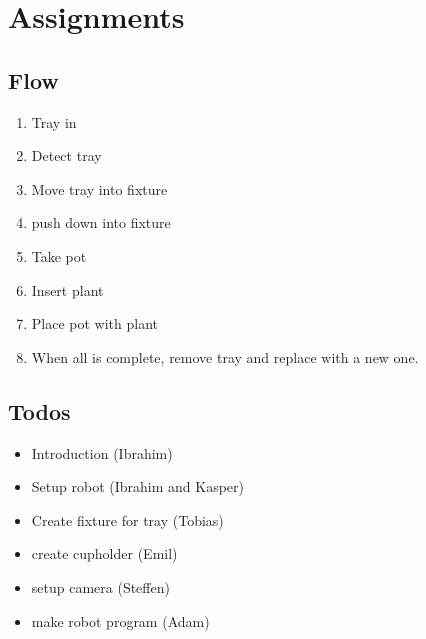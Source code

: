 \documentclass[Setup/main.tex]{subfiles}
\begin{document}
\section{Assignments}

\subsection{Flow}
\begin{enumerate}
    \item Tray in
    \item Detect tray
    \item Move tray into fixture
    \item push down into fixture
    \item Take pot
    \item Insert plant
    \item Place pot with plant
    \item When all is complete, remove tray and replace with a new one.
\end{enumerate}

\subsection{Todos}
\begin{itemize}
    \item Introduction (Ibrahim)
    \item Setup robot (Ibrahim and Kasper)
    \item Create fixture for tray (Tobias)
    \item create cupholder (Emil)
    \item setup camera (Steffen)
    \item make robot program (Adam)
\end{itemize}
\end{document}

